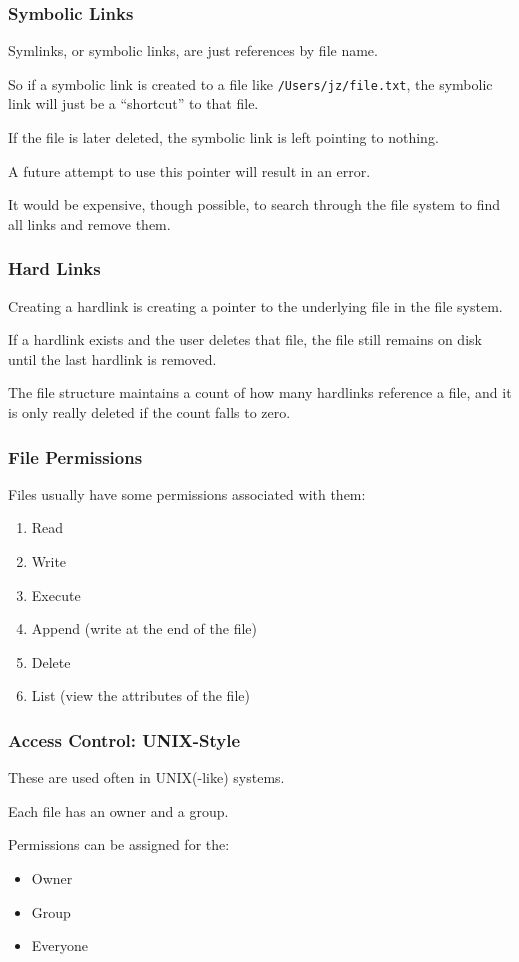 \begin{frame}
\frametitle{Symbolic Links}

Symlinks, or symbolic links, are just references by file name. 

So if a symbolic link is created to a file like \texttt{/Users/jz/file.txt}, the symbolic link will just be a ``shortcut'' to that file. 

If the file is later deleted, the symbolic link is left pointing to nothing. 

A future attempt to use this pointer will result in an error.

It would be expensive, though possible, to search through the file system to find all links and remove them.


\end{frame}

\begin{frame}
\frametitle{Hard Links}

Creating a hardlink is creating a pointer to the underlying file in the file system. 

If a hardlink exists and the user deletes that file, the file still remains on disk until the last hardlink is removed. 

The file structure maintains a count of how many hardlinks reference a file, and it is only really deleted if the count falls to zero.


\end{frame}



\begin{frame}
\frametitle{File Permissions}

Files usually have some permissions associated with them:

\begin{enumerate}
	\item Read
	\item Write
	\item Execute
	\item Append (write at the end of the file)
	\item Delete
	\item List (view the attributes of the file)
\end{enumerate} 

\end{frame}

\begin{frame}
\frametitle{Access Control: UNIX-Style}

These are used often in UNIX(-like) systems.

Each file has an owner and a group. 

Permissions can be assigned for the:
\begin{itemize}
	\item Owner
	\item Group
	\item Everyone
\end{itemize}


\end{frame}

